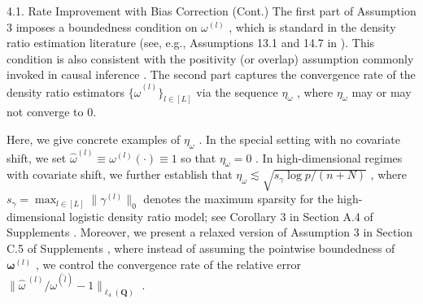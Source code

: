 \documentclass{beamer}
\begin{document}
\begin{frame}{4.1. Rate Improvement with Bias Correction (Cont.)}
    The first part of Assumption 3 imposes a boundedness condition on $\omega ^ { ( l ) }$ , which is standard in the density ratio estimation literature (see, e.g., Assumptions 13.1 and 14.7 in \cite{56}). This condition is also consistent with the positivity (or overlap) assumption commonly invoked in causal inference \cite{45, 12}. The second part captures the convergence rate of the density ratio estimators $\{ \widehat \omega ^ { ( l ) } \} _ { l \in [ L ] }$ via the sequence $\eta _ { \omega }$ , where $\eta _ { \omega }$ may or may not converge to 0.
    
    Here, we give concrete examples of $\eta _ { \omega }$ . In the special setting with no covariate shift, we set $\widehat { \omega } ^ { ( l ) } \equiv \omega ^ { ( l ) } ( \cdot ) \equiv 1$ so that $\eta _ { \omega } = 0$ . In high-dimensional regimes with covariate shift, we further establish that $\eta _ { \omega } \lesssim \sqrt { s _ { \gamma } \log p / ( n + N ) }$ , where $s _ { \gamma } = \operatorname* { m a x } _ { l \in [ L ] } \| \gamma ^ { ( l ) } \| _ { 0 }$ denotes the maximum sparsity for the high-dimensional logistic density ratio model; see Corollary 3 in Section A.4 of Supplements \cite{62}. Moreover, we present a relaxed version of Assumption 3 in Section C.5 of Supplements \cite{62}, where instead of assuming the pointwise boundedness of $\boldsymbol { \omega } ^ { ( l ) }$ , we control the convergence rate of the relative error $\lVert \widehat { \omega } ^ { \ ( l ) } / \omega ^ { ( \widehat { l } ) } - 1 \rVert _ { \ell _ { 4 } ( \mathbf { Q } ) }$ .
\end{frame}
\end{document}
